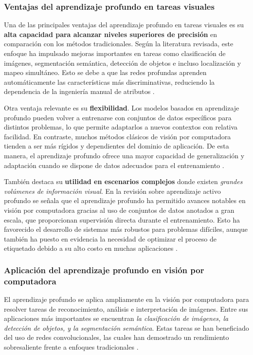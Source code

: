 \subsubsection{Ventajas del aprendizaje profundo en tareas visuales}

Una de las principales ventajas del aprendizaje profundo en tareas visuales es su \textbf{alta capacidad para alcanzar niveles superiores de precisión} en comparación con los métodos tradicionales. Según la literatura revisada, este enfoque ha impulsado mejoras importantes en tareas como clasificación de imágenes, segmentación semántica, detección de objetos e incluso localización y mapeo simultáneo. Esto se debe a que las redes profundas aprenden automáticamente las características más discriminativas, reduciendo la dependencia de la ingeniería manual de atributos \cite{omahony2019deep_learning_vs_traditional_cv}.

Otra ventaja relevante es su \textbf{flexibilidad}. Los modelos basados en aprendizaje profundo pueden volver a entrenarse con conjuntos de datos específicos para distintos problemas, lo que permite adaptarlos a nuevos contextos con relativa facilidad. En contraste, muchos métodos clásicos de visión por computadora tienden a ser más rígidos y dependientes del dominio de aplicación. De esta manera, el aprendizaje profundo ofrece una mayor capacidad de generalización y adaptación cuando se dispone de datos adecuados para el entrenamiento \cite{omahony2019deep_learning_vs_traditional_cv}.

También destaca su \textbf{utilidad en escenarios complejos} donde existen \textit{grandes volúmenes de información visual}. En la revisión sobre aprendizaje activo profundo se señala que el aprendizaje profundo ha permitido avances notables en visión por computadora gracias al uso de conjuntos de datos anotados a gran escala, que proporcionan supervisión directa durante el entrenamiento. Esto ha favorecido el desarrollo de sistemas más robustos para problemas difíciles, aunque también ha puesto en evidencia la necesidad de optimizar el proceso de etiquetado debido a su alto costo en muchas aplicaciones \cite{wu2022deep_active_learning}.

\subsubsection{Aplicación del aprendizaje profundo en visión por computadora}

El aprendizaje profundo se aplica ampliamente en la visión por computadora para resolver tareas de reconocimiento, análisis e interpretación de imágenes. Entre sus aplicaciones más importantes se encuentran \textit{la clasificación de imágenes, la detección de objetos, y la segmentación semántica}. Estas tareas se han beneficiado del uso de redes convolucionales, las cuales han demostrado un rendimiento sobresaliente frente a enfoques tradicionales \cite{omahony2019deep_learning_vs_traditional_cv}.

